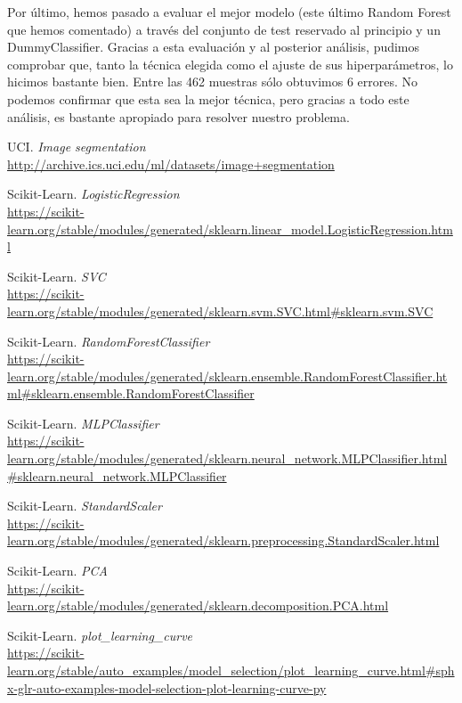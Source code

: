 \documentclass[11pt,a4paper]{article}
\begin{document}
Por último, hemos pasado a evaluar el mejor modelo (este último Random Forest que hemos comentado) a través del conjunto de test reservado al principio y un DummyClassifier. Gracias a esta evaluación y al posterior análisis, pudimos comprobar que, tanto la técnica elegida como el ajuste de sus hiperparámetros, lo hicimos bastante bien. Entre las 462 muestras sólo obtuvimos 6 errores. No podemos confirmar que esta sea la mejor técnica, pero gracias a todo este análisis, es bastante apropiado para resolver nuestro problema.

\newpage

\begin{thebibliography}{20}

UCI. \textit{Image segmentation}
\\\url{http://archive.ics.uci.edu/ml/datasets/image+segmentation}

Scikit-Learn. \textit{LogisticRegression}
\\\url{https://scikit-learn.org/stable/modules/generated/sklearn.linear_model.LogisticRegression.html}

Scikit-Learn. \textit{SVC}
\\\url{https://scikit-learn.org/stable/modules/generated/sklearn.svm.SVC.html#sklearn.svm.SVC}

Scikit-Learn. \textit{RandomForestClassifier}
\\\url{https://scikit-learn.org/stable/modules/generated/sklearn.ensemble.RandomForestClassifier.html#sklearn.ensemble.RandomForestClassifier}

Scikit-Learn. \textit{MLPClassifier}
\\\url{https://scikit-learn.org/stable/modules/generated/sklearn.neural_network.MLPClassifier.html#sklearn.neural_network.MLPClassifier}

Scikit-Learn. \textit{StandardScaler}
\\\url{https://scikit-learn.org/stable/modules/generated/sklearn.preprocessing.StandardScaler.html}

Scikit-Learn. \textit{PCA}
\\\url{https://scikit-learn.org/stable/modules/generated/sklearn.decomposition.PCA.html}

Scikit-Learn. \textit{plot\_learning\_curve}
\\\url{https://scikit-learn.org/stable/auto_examples/model_selection/plot_learning_curve.html#sphx-glr-auto-examples-model-selection-plot-learning-curve-py}


\end{thebibliography}
\end{document}
